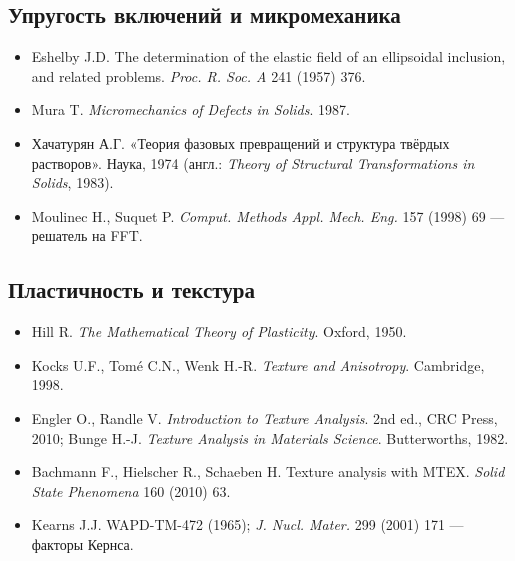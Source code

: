 \subsection*{Упругость включений и микромеханика}
\begin{itemize}
\item Eshelby J.D. The determination of the elastic field of an ellipsoidal inclusion, and related problems.
  \emph{Proc. R. Soc. A} 241 (1957) 376.
\item Mura T. \emph{Micromechanics of Defects in Solids}. 1987.
\item Хачатурян А.Г. «Теория фазовых превращений и структура твёрдых растворов». Наука, 1974
  (англ.: \emph{Theory of Structural Transformations in Solids}, 1983).
\item Moulinec H., Suquet P. \emph{Comput. Methods Appl. Mech. Eng.} 157 (1998) 69 --- решатель на FFT.
\end{itemize}

\subsection*{Пластичность и текстура}
\begin{itemize}
\item Hill R. \emph{The Mathematical Theory of Plasticity}. Oxford, 1950.
\item Kocks U.F., Tom\'e C.N., Wenk H.-R. \emph{Texture and Anisotropy}. Cambridge, 1998.
\item Engler O., Randle V. \emph{Introduction to Texture Analysis}. 2nd ed., CRC Press, 2010; Bunge H.-J.
  \emph{Texture Analysis in Materials Science}. Butterworths, 1982.
\item Bachmann F., Hielscher R., Schaeben H. Texture analysis with MTEX. \emph{Solid State Phenomena} 160 (2010) 63.
\item Kearns J.J. WAPD-TM-472 (1965); \emph{J. Nucl. Mater.} 299 (2001) 171 --- факторы Кернса.
\end{itemize}

